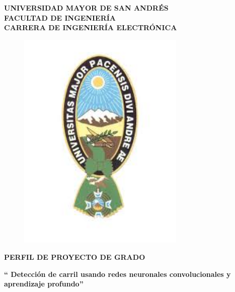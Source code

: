 \documentclass[12pt,letterpaper]{article}
\begin{document}
\marginsize{2.5cm}{2cm}{2cm}{2cm} 



\begin{titlepage}
\begin{center}
\vspace*{-0.5in}
\begin{large}
\textbf{UNIVERSIDAD MAYOR DE SAN ANDRÉS}\\
\vspace*{0.15in}
\textbf{FACULTAD DE INGENIERÍA}\\
\vspace*{0.15in}
\textbf{CARRERA DE INGENIERÍA ELECTRÓNICA}\\
\vspace*{0.1in}
\end{large}
\begin{figure}[htb]
\begin{center}
\includegraphics[width=8cm]{umsa.jpg}
\end{center}
\end{figure}
\begin{Large}
\textbf{PERFIL DE PROYECTO DE GRADO} 
\end{Large}
\vspace*{0.4in}

\begin{normalsize}
\textbf{`` Detección de carril usando redes neuronales convolucionales y aprendizaje profundo''} \\
\end{normalsize}




\end{center}
\end{titlepage}
\end{document}
